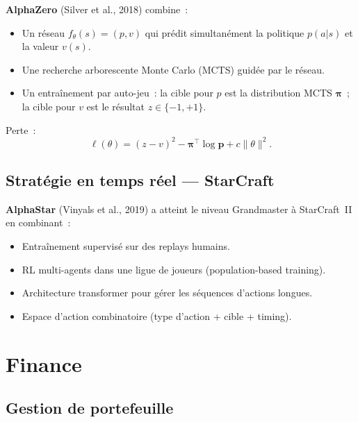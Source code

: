 \begin{definition}[AlphaZero]
\textbf{AlphaZero} (Silver et al., 2018) combine~:
\begin{itemize}
    \item Un r\'eseau $f_\theta(s) = (p, v)$ qui pr\'edit simultan\'ement la
    politique $p(a|s)$ et la valeur $v(s)$.
    \item Une recherche arborescente Monte Carlo (MCTS) guid\'ee par le r\'eseau.
    \item Un entra\^inement par auto-jeu~: la cible pour $p$ est la distribution
    MCTS $\boldsymbol{\pi}$~; la cible pour $v$ est le r\'esultat $z \in \{-1, +1\}$.
\end{itemize}
Perte~:
\[
    \ell(\theta) = (z - v)^2 - \boldsymbol{\pi}^\top \log \mathbf{p} + c \|\theta\|^2.
\]
\end{definition}

\subsection{Strat\'egie en temps r\'eel --- StarCraft}

\begin{exemple}[AlphaStar]
\textbf{AlphaStar} (Vinyals et al., 2019) a atteint le niveau Grandmaster \`a
StarCraft~II en combinant~:
\begin{itemize}
    \item Entra\^inement supervis\'e sur des replays humains.
    \item RL multi-agents dans une ligue de joueurs (population-based training).
    \item Architecture transformer pour g\'erer les s\'equences d'actions longues.
    \item Espace d'action combinatoire (type d'action + cible + timing).
\end{itemize}
\end{exemple}

\section{Finance}

\subsection{Gestion de portefeuille}

